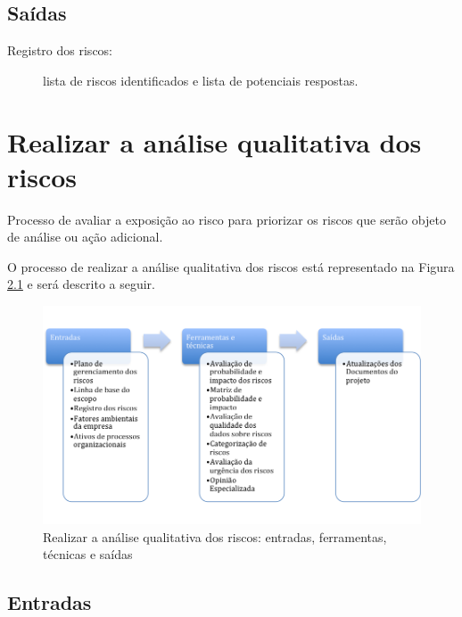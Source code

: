 \section{Saídas}

\begin{description}
	
	\item[Registro dos riscos:] lista de riscos identificados e lista de potenciais respostas.
	
\end{description}

\chapter{Realizar a análise qualitativa dos riscos}

Processo de avaliar a exposição ao risco para priorizar os riscos que serão objeto de análise ou ação adicional.

O processo de realizar a análise qualitativa dos riscos está representado na Figura \ref{fig:riscos:analise:qual:efts} e será descrito a seguir.

\begin{figure}[!h]
	\centering
	\includegraphics[scale=0.5]{Figuras/riscos_efts_analise_qual.png}
	\caption{Realizar a análise qualitativa dos riscos: entradas, ferramentas, técnicas e saídas}
	\label{fig:riscos:analise:qual:efts}
\end{figure}

\section{Entradas}

